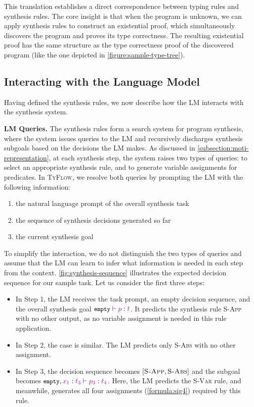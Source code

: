 \documentclass[manuscript,screen]{acmart}
\newcommand{\stlctype}[3]{{#1} \vdash {#2} : {#3}}
\newcommand{\sk}[1]{\textcolor{skunknown}{#1}}
\newcommand{\toolname}[1]{\textsc{#1}}
\newcommand{\tcode}[1]{{\small \texttt{\spaceskip=0.2em #1}}}
\newcommand{\mainname}{\toolname{TyFlow}\xspace}
\begin{document}
This translation establishes a direct correspondence between typing rules and synthesis rules. The core insight is that when the program is unknown, we can apply synthesis rules to construct an existential proof, which simultaneously discovers the program and proves its type correctness. The resulting existential proof has the same structure as the type correctness proof of the discovered program (like the one depicted in \autoref{figure:sample-type-tree}).


\subsection{Interacting with the Language Model}

Having defined the synthesis rules, we now describe how the LM interacts with the synthesis system.

\noindent \textbf{LM Queries.} The synthesis rules form a search system for program synthesis, where the system issues queries to the LM and recursively discharges synthesis subgoals based on the decisions the LM makes. 
As discussed in \autoref{subsection:moti-representation}, at each synthesis step, the system raises two types of queries: to select an appropriate synthesis rule, and to generate variable assignments for predicates. In \mainname, we resolve both queries by prompting the LM with the following information:
\begin{enumerate}
    \item the natural language prompt of the overall synthesis task
    \item the sequence of synthesis decisions generated so far
    \item the current synthesis goal
\end{enumerate}

To simplify the interaction, we do not distinguish the two types of queries and assume that the LM can learn to infer what information is needed in each step from the context.
%
\autoref{fig:synthesis-sequence} illustrates the expected decision sequence for our sample task.
%
Let us consider the first three steps:
\begin{itemize}
\item In Step 1, the LM receives the task prompt, an empty decision sequence, and the overall synthesis goal $\stlctype{\tcode{empty}}{\sk{p}}{\sk{t}}$. It predicts the synthesis rule \textsc{S-App} with no other output, as no variable assignment is needed in this rule application.
\item In Step 2, the case is similar. The LM predicts only \textsc{S-Abs} with no other assignment.
\item In Step 3, the decision sequence becomes $[\textsc{S-App}, \textsc{S-Abs}]$ and the subgoal becomes $\stlctype{\snoc{\tcode{empty}}{\sk{x_1}}{\sk{t_3}}}{\sk{p_3}}{\sk{t_4}}$. Here, the LM predicts the \textsc{S-Var} rule, and meanwhile, generates all four assignments (\autoref{formula:sig4}) required by this rule.
\end{itemize}
\end{document}
